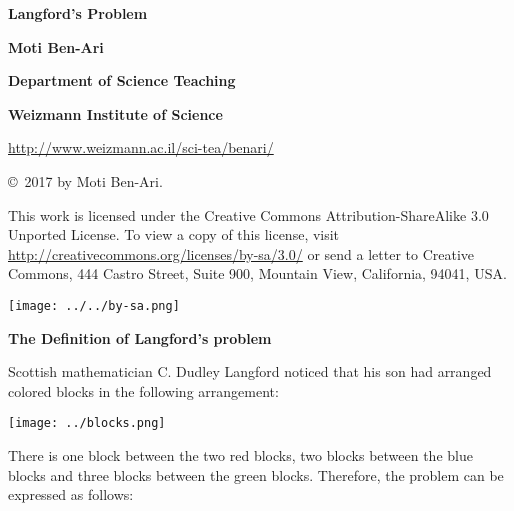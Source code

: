 \documentclass[11pt,a4paper]{report}
\begin{document}
\thispagestyle{empty}

\begin{center}

\textbf{\huge Langford's Problem}

\bigskip
\bigskip
\bigskip

\textbf{\LARGE Moti Ben-Ari}

\bigskip

\textbf{\Large Department of Science Teaching}

\bigskip

\textbf{\Large Weizmann Institute of Science}

\bigskip

\url{http://www.weizmann.ac.il/sci-tea/benari/}

\end{center}

\bigskip
\bigskip

\begin{center}
\copyright{}\  2017 by Moti Ben-Ari.
\end{center}

\begin{footnotesize}
This work is licensed under the Creative Commons Attribution-ShareAlike 3.0 Unported License. To view a copy of this license, visit \url{http://creativecommons.org/licenses/by-sa/3.0/} or send a letter to Creative Commons, 444 Castro Street, Suite 900, Mountain View, California, 94041, USA.
\end{footnotesize}

\bigskip

\begin{center}
\texttt{[image: ../../by-sa.png]}
\end{center}

\newpage

\begin{center}
\textbf{\Large The Definition of Langford's problem}
\end{center}

Scottish mathematician C. Dudley Langford noticed that his son had arranged colored blocks in the following arrangement:
\begin{center}
\texttt{[image: ../blocks.png]}
\end{center}
There is one block between the two red blocks, two blocks between the blue blocks and three blocks between the green blocks. Therefore, the problem can be expressed as follows:
\end{document}
